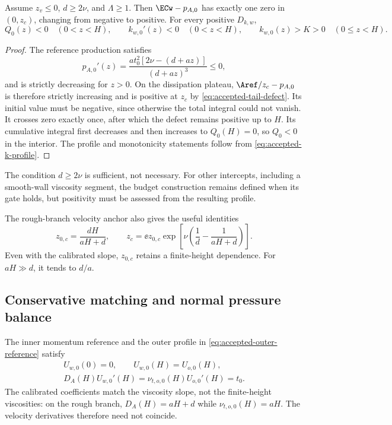 \begin{proposition}
Assume $z_v\leq0$, $d\geq2\nu$, and $\Lambda\geq1$.
Then $\ECw-p_{A,0}$ has exactly one zero in $(0,z_c)$,
changing from negative to positive. For every positive $D_{k,w}$,
\begin{equation}
 Q_0(z)<0\quad(0<z<H),\qquad
 k_{w,0}'(z)<0\quad(0<z<H),\qquad
 k_{w,0}(z)>K>0\quad(0\leq z<H).
 \label{eq:accepted-positivity}
\end{equation}
\end{proposition}
\begin{proof}
The reference production satisfies
\[
 p_{A,0}'(z)=
 \frac{a t_0^2[2\nu-(d+az)]}{(d+az)^3}\leq0,
\]
and is strictly decreasing for $z>0$. On the dissipation plateau,
$\Aref/z_c-p_{A,0}$ is therefore strictly increasing and is
positive at $z_c$ by \cref{eq:accepted-tail-defect}.
Its initial value must be negative, since otherwise the total
integral could not vanish. It crosses zero exactly once, after
which the defect remains positive up to $H$. Its cumulative
integral first decreases and then increases to $Q_0(H)=0$, so
$Q_0<0$ in the interior. The profile and monotonicity statements
follow from \cref{eq:accepted-k-profile}.
\end{proof}
The condition $d\geq2\nu$ is sufficient, not necessary.
For other intercepts, including a smooth-wall viscosity segment,
the budget construction remains defined when its gate holds, but
positivity must be assessed from the resulting profile.

The rough-branch velocity anchor also gives the useful identities
\begin{equation}
 \boxed{z_{0,c}=\frac{dH}{aH+d},\qquad
 z_c=\ee z_{0,c}
 \exp\!\left[\nu\left(\frac1d-\frac1{aH+d}\right)\right].}
 \label{eq:accepted-roughness-cutoff}
\end{equation}
Even with the calibrated slope, $z_{0,c}$ retains a finite-height
dependence. For $aH\gg d$, it tends to $d/a$.

\subsection{Conservative matching and normal pressure balance}
\label{app:accepted-awf-matching}

The inner momentum reference and the outer profile in
\cref{eq:accepted-outer-reference} satisfy
\begin{equation}
 \begin{gathered}
 U_{w,0}(0)=0,\qquad U_{w,0}(H)=U_{o,0}(H),\\
 D_A(H)U_{w,0}'(H)
 =\nu_{t,o,0}(H)U_{o,0}'(H)=t_0.
 \end{gathered}
 \label{eq:accepted-momentum-match}
\end{equation}
The calibrated coefficients match the viscosity slope, not the
finite-height viscosities: on the rough branch,
$D_A(H)=aH+d$ while $\nu_{t,o,0}(H)=aH$.
The velocity derivatives therefore need not coincide.

